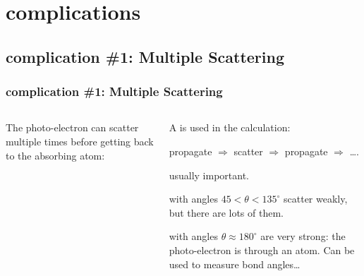 \section{{\feff} complications}

\subsection{{\feff} complication \#1: Multiple Scattering}
\begin{frame} \frametitle{{\feff} complication \#1: Multiple Scattering}

  \vmm
\begin{columns}
  \begin{column}{50mm}
  The photo-electron can scatter multiple times before getting back to the
  absorbing atom:

  \begin{center}
  \end{center}

  \end{column}
  \begin{column}{60mm}

  A {} is used in the  calculation:

  \begin{center}
    propagate $\Rightarrow$ scatter $\Rightarrow$ propagate $\Rightarrow$ \ldots.
  \end{center}

  \vmm  
    usually important.

   with angles $ 45 < \theta <
  135^{\circ}$ scatter weakly, but there are lots of them.

   with angles $\theta \approx 180^{\circ}$
   are very strong: the photo-electron is {} through an atom.
   Can be used to measure bond angles\ldots

  \end{column}
  \end{columns}

   \begin{postitbox}{92mm}
   \end{postitbox}
\end{frame}

